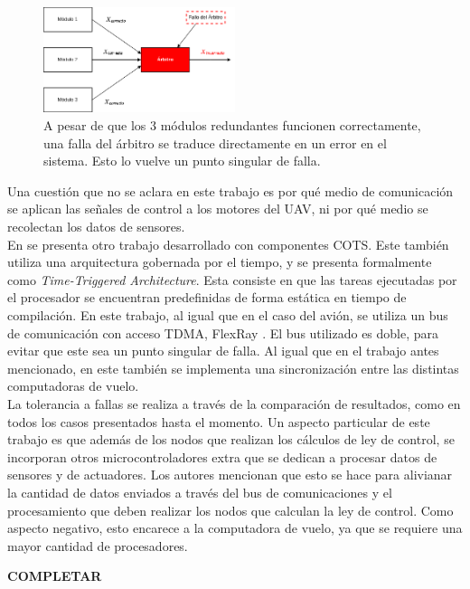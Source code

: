 \begin{figure}[H]
    \centering
    \includegraphics[width=0.5\textwidth]{img/falla_arbitro.png}
    \caption{A pesar de que los 3 módulos redundantes funcionen correctamente, una falla del árbitro se traduce directamente en un error en el sistema. Esto lo vuelve un punto singular de falla.}
    \label{fig:falla_arbitro}
\end{figure}

Una cuestión que no se aclara en este trabajo es por qué medio de comunicación se aplican las señales de control a los motores del UAV, ni por qué medio se recolectan los datos de sensores.\\

En \cite{zhang2020architecture} se presenta otro trabajo desarrollado con componentes COTS. Este también utiliza una arquitectura gobernada por el tiempo, y se presenta formalmente como \textit{Time-Triggered Architecture}. Esta consiste en que las tareas ejecutadas por el procesador se encuentran predefinidas de forma estática en tiempo de compilación. En este trabajo, al igual que en el caso del avión, se utiliza un bus de comunicación con acceso TDMA, FlexRay \cite{nxpAN12233}. El bus utilizado es doble, para evitar que este sea un punto singular de falla. Al igual que en el trabajo antes mencionado, en este también se implementa una sincronización entre las distintas computadoras de vuelo.\\

La tolerancia a fallas se realiza a través de la comparación de resultados, como en todos los casos presentados hasta el momento. Un aspecto particular de este trabajo es que además de los nodos que realizan los cálculos de ley de control, se incorporan otros microcontroladores extra que se dedican a procesar datos de sensores y de actuadores. Los autores mencionan que esto se hace para alivianar la cantidad de datos enviados a través del bus de comunicaciones y el procesamiento que deben realizar los nodos que calculan la ley de control. Como aspecto negativo, esto encarece a la computadora de vuelo, ya que se requiere una mayor cantidad de procesadores.

\textbf{{\color{red} COMPLETAR}}